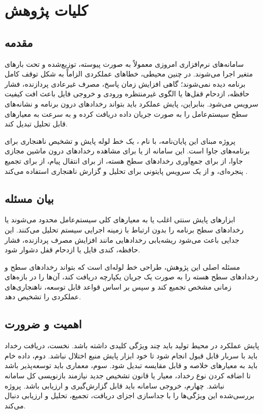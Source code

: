 \chapter{کلیات پژوهش}

\section{مقدمه}

سامانه‌های نرم‌افزاری امروزی معمولاً به صورت پیوسته، توزیع‌شده و تحت
بارهای متغیر اجرا می‌شوند. در چنین محیطی، خطاهای عملکردی الزاماً به شکل
توقف کامل برنامه دیده نمی‌شوند؛ گاهی افزایش زمان پاسخ، مصرف غیرعادی
پردازنده، فشار حافظه، ازدحام قفل‌ها یا الگوی غیرمنتظره ورودی و خروجی فایل
باعث افت کیفیت سرویس می‌شود. بنابراین، پایش عملکرد باید بتواند رخدادهای
درون برنامه و نشانه‌های سطح سیستم‌عامل را به صورت جریان داده دریافت کرده
و به سرعت به معیارهای قابل تحلیل تبدیل کند.

پروژه مبنای این پایان‌نامه، با نام ، یک خط لوله
پایش و تشخیص ناهنجاری برای برنامه‌های جاوا است. این سامانه از
 یا  برای مشاهده رخدادهای درون ماشین
مجازی جاوا، از  برای جمع‌آوری رخدادهای سطح هسته، از
 برای انتقال پیام، از  برای تجمیع
پنجره‌ای، و از یک سرویس پایتونی برای تحلیل و گزارش ناهنجاری استفاده
می‌کند \cite{cefinalproject,jfrdocs,kafkastreams,ebpfdocs}.

\section{بیان مسئله}

ابزارهای پایش سنتی اغلب یا به معیارهای کلی سیستم‌عامل محدود می‌شوند یا
رخدادهای سطح برنامه را بدون ارتباط با زمینه اجرایی سیستم تحلیل می‌کنند.
این جدایی باعث می‌شود ریشه‌یابی رخدادهایی مانند افزایش مصرف پردازنده،
فشار حافظه، کندی فایل یا ازدحام قفل دشوار شود.

مسئله اصلی این پژوهش، طراحی خط لوله‌ای است که بتواند رخدادهای سطح
 و رخدادهای سطح هسته را به صورت یک جریان یکپارچه دریافت کند،
آن‌ها را در بازه‌های زمانی مشخص تجمیع کند و سپس بر اساس قواعد قابل توسعه،
ناهنجاری‌های عملکردی را تشخیص دهد.

\section{اهمیت و ضرورت}

پایش عملکرد در محیط تولید باید چند ویژگی کلیدی داشته باشد. نخست، دریافت
رخداد باید با سربار قابل قبول انجام شود تا خود ابزار پایش منبع اختلال
نباشد. دوم، داده خام باید به معیارهای خلاصه و قابل مقایسه تبدیل شود.
سوم، معماری باید توسعه‌پذیر باشد تا اضافه کردن نوع رخداد، معیار یا قانون
تشخیص جدید نیازمند بازنویسی کل سامانه نباشد. چهارم، خروجی سامانه باید
قابل گزارش‌گیری و ارزیابی باشد. پروژه بررسی‌شده این ویژگی‌ها را با
جداسازی اجزای دریافت، تجمیع، تحلیل و ارزیابی دنبال می‌کند.

